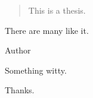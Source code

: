 \begin{abstract}
This is a thesis.

\end{abstract}


\begin{declaration}
There are many like it.

\vspace*{1cm}

\begin{flushright}
Author
\end{flushright}

\end{declaration}


\begin{preface}

Something witty.
\end{preface}

\begin{acknowledgements}
Thanks.

\end{acknowledgements}


\tableofcontents
